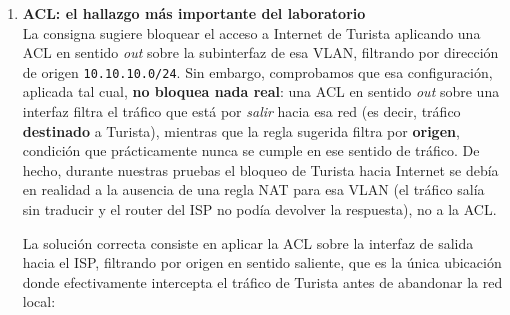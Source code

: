 \documentclass[11pt,a4paper]{article}
\begin{document}
\begin{enumerate}
\begin{enumerate}
        Para dar salida a Internet a Business y a Administración (Turista no debe tenerla), se configuró NAT con sobrecarga (\textit{overload}/PAT) sobre la interfaz pública del router. \textit{NAT} reescribe la IP de origen del paquete, cambiándola de la privada del PC a la IP pública del router antes de enviarlo, y realiza el proceso inverso al recibir la respuesta.

        \begin{lstlisting}
        Router1(config)# access-list 20 permit 10.10.20.0 0.0.0.255
        Router1(config)# access-list 20 permit 10.10.99.0 0.0.0.255
        Router1(config)# ip nat inside source list 20 interface GigabitEthernet0/1 overload
        Router1(config)# interface GigabitEthernet0/0.10
        Router1(config-subif)# ip nat inside
        Router1(config-subif)# interface GigabitEthernet0/0.20
        Router1(config-subif)# ip nat inside
        Router1(config-subif)# interface GigabitEthernet0/0.99
        Router1(config-subif)# ip nat inside
        Router1(config-subif)# interface GigabitEthernet0/1
        Router1(config-if)# ip nat outside
        Router1(config)# ip route 0.0.0.0 0.0.0.0 200.0.0.2
        \end{lstlisting}

        Cabe destacar que la red de Administración (\texttt{10.10.99.0/24}) también se agregó a la \texttt{access-list 20}, ya que la consigna exige que ese segmento tenga ``acceso total'', incluyendo Internet.

      \item
      \textbf{ACL: el hallazgo más importante del laboratorio} \\[0.5em]
        La consigna sugiere bloquear el acceso a Internet de Turista aplicando una ACL en sentido \textit{out} sobre la subinterfaz de esa VLAN, filtrando por dirección de origen \texttt{10.10.10.0/24}. Sin embargo, comprobamos que esa configuración, aplicada tal cual, \textbf{no bloquea nada real}: una ACL en sentido \textit{out} sobre una interfaz filtra el tráfico que está por \textit{salir} hacia esa red (es decir, tráfico \textbf{destinado} a Turista), mientras que la regla sugerida filtra por \textbf{origen}, condición que prácticamente nunca se cumple en ese sentido de tráfico. De hecho, durante nuestras pruebas el bloqueo de Turista hacia Internet se debía en realidad a la ausencia de una regla NAT para esa VLAN (el tráfico salía sin traducir y el router del ISP no podía devolver la respuesta), no a la ACL.

        La solución correcta consiste en aplicar la ACL sobre la interfaz de salida hacia el ISP, filtrando por origen en sentido saliente, que es la única ubicación donde efectivamente intercepta el tráfico de Turista antes de abandonar la red local:


\end{enumerate}
\end{enumerate}
\end{document}
